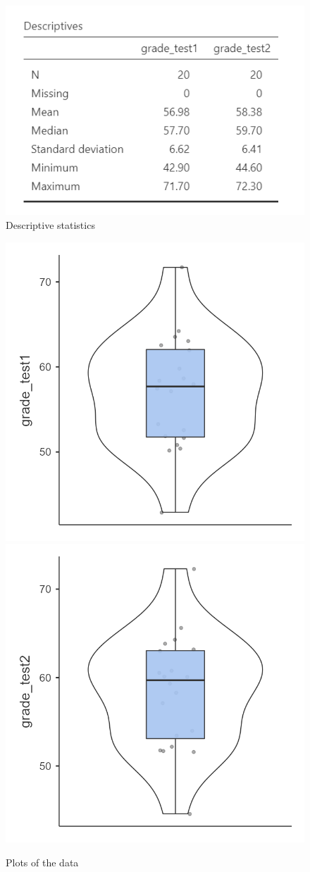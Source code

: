 \documentclass[
]{book}
\begin{document}
\begin{figure}

{\centering \includegraphics[width=0.8\linewidth]{images/03_dependent_t-test/dependent_descriptives} 

}

\caption{Descriptive statistics}\label{fig:unnamed-chunk-3}
\end{figure}

\begin{figure}

{\centering \includegraphics[width=0.49\linewidth]{images/03_dependent_t-test/dependent_plot1} \includegraphics[width=0.49\linewidth]{images/03_dependent_t-test/dependent_plot2} 

}

\caption{Plots of the data}\label{fig:unnamed-chunk-4}
\end{figure}
\end{document}
